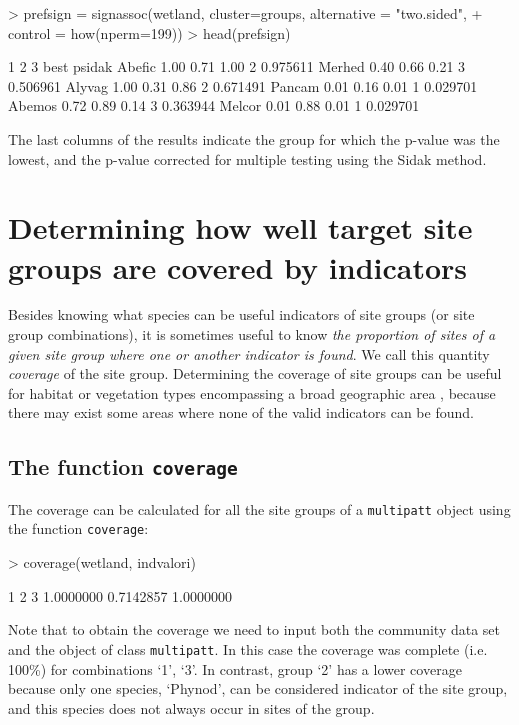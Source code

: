 \documentclass[11pt,a4paper]{article}
\begin{document}
\begin{Schunk}
\begin{Sinput}
> prefsign = signassoc(wetland, cluster=groups,  alternative = "two.sided", 
+                      control = how(nperm=199)) 
> head(prefsign)
\end{Sinput}
\begin{Soutput}
          1    2    3 best   psidak
Abefic 1.00 0.71 1.00    2 0.975611
Merhed 0.40 0.66 0.21    3 0.506961
Alyvag 1.00 0.31 0.86    2 0.671491
Pancam 0.01 0.16 0.01    1 0.029701
Abemos 0.72 0.89 0.14    3 0.363944
Melcor 0.01 0.88 0.01    1 0.029701
\end{Soutput}
\end{Schunk}
The last columns of the results indicate the group for which the p-value was the lowest, and the p-value corrected for multiple testing using the Sidak method.

\section{Determining how well target site groups are covered by indicators}
Besides knowing what species can be useful indicators of site groups (or site group combinations), it is sometimes useful to know \emph{the proportion of sites of a given site group where one or another indicator is found}. We call this quantity \emph{coverage} of the site group. Determining the coverage of site groups can be useful for habitat or vegetation types encompassing a broad geographic area \citep{DeCaceres2012}, because there may exist some areas where none of the valid indicators can be found.  
\subsection{The function \texttt{coverage}}
The coverage can be calculated for all the site groups of a \texttt{multipatt} object using the function \texttt{coverage}:
\begin{Schunk}
\begin{Sinput}
> coverage(wetland, indvalori)
\end{Sinput}
\begin{Soutput}
        1         2         3 
1.0000000 0.7142857 1.0000000 
\end{Soutput}
\end{Schunk}
Note that to obtain the coverage we need to input both the community data set and the object of class \texttt{multipatt}. In this case the coverage was complete (i.e. 100\%) for combinations `1', `3'. In contrast, group `2' has a lower coverage because only one species, `Phynod', can be considered indicator of the site group, and this species does not always occur in sites of the group. 
\end{document}
